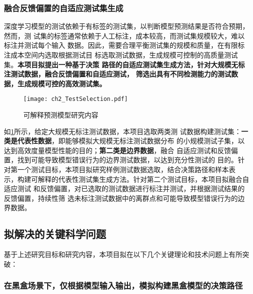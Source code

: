 \subsubsection{融合反馈偏置的自适应测试集生成}
深度学习模型的测试依赖于有标签的测试集，以判断模型预测结果是否符合预期，然而，测
试集的标签通常依赖于人工标注，成本较高，而测试集规模较大，难以标注并测试每个输入
数据。因此，{需要合理平衡测试集的规模和质量，在有限标注成本空间内选取根据测试目
标选取测试数据，生成规模可控制的高质量测试集}。\textbf{本项目拟提出一种基于决策
路径的自适应测试集生成方法，针对大规模无标注测试数据，融合反馈偏置和自适应测试，
筛选出具有不同检测能力的测试数据，生成规模可控的高效测试集。}

\begin{figure}[htp]
    \begin{small}
        \begin{center}
            \texttt{[image: ch2\_TestSelection.pdf]}
        \end{center}
        \caption{可解释预测模型研究内容}
        \label{fig:ch2:testselection}
    \end{small}
\end{figure}

如\cref{fig:ch2:testselection}所示，给定大规模无标注测试数据，{本项目选取两类测
试数据构建测试集：\textbf{一类是代表性数据}，即能够模拟大规模无标注测试数据分布
的小规模测试子集，以达到高效度量模型性能的目的；\textbf{第二类是边界数据}，融合
自适应测试和反馈偏置，找到可能导致模型错误行为的边界测试数据，以达到充分性测试的
目的}。针对第一个测试目标，本项目拟研究样例测试数据选取，结合决策路径和样本表
示，构建可解释的代表性测试集生成方法。针对第二个测试目标，本项目拟融合自适应测试
和反馈偏置，对已选取的测试数据进行标注并测试，并根据测试结果的反馈偏置，持续性筛
选未标注测试数据中的离群点和可能导致模型错误行为的边界数据。






\subsection{拟解决的关键科学问题}

基于上述研究目标和研究内容，本项目拟在以下几个关键理论和技术问题上有所突破：

\subsubsection{在黑盒场景下，仅根据模型输入输出，模拟构建黑盒模型的决策路径}

